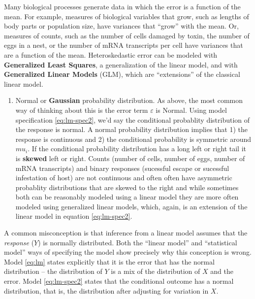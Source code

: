 \documentclass[]{book}
\providecommand{\tightlist}{%
  \setlength{\itemsep}{0pt}\setlength{\parskip}{0pt}}
\begin{document}
Many biological processes generate data in which the error is a function
of the mean. For example, measures of biological variables that grow,
such as lengths of body parts or population size, have variances that
``grow'' with the mean. Or, measures of counts, such as the number of
cells damaged by toxin, the number of eggs in a nest, or the number of
mRNA transcripts per cell have variances that are a function of the
mean. Heteroskedastic error can be modeled with \textbf{Generalized
Least Squares}, a generalization of the linear model, and with
\textbf{Generalized Linear Models} (GLM), which are ``extensions'' of
the classical linear model.

\begin{enumerate}
\def\labelenumi{\arabic{enumi}.}
\setcounter{enumi}{1}
\tightlist
\item
  Normal or \textbf{Gaussian} probability distribution. As above, the
  most common way of thinking about this is the error term
  \(\varepsilon\) is Normal. Using model specification
  \eqref{eq:lm-spec2}, we'd say the conditional probablity distribution of
  the response is normal. A normal probability distribution implies that
  1) the response is continuous and 2) the conditional probability is
  symmetric around \(mu_i\). If the conditional probability distribution
  has a long left or right tail it is \textbf{skewed} left or right.
  Counts (number of cells, number of eggs, number of mRNA transcripts)
  and binary responses (sucessful escape or sucessful infestation of
  host) are not continuous and often often have asymmetric probablity
  distributions that are skewed to the right and while sometimes both
  can be reasonably modeled using a linear model they are more often
  modeled using generalized linear models, which, again, is an extension
  of the linear model in equation \eqref{eq:lm-spec2}.
\end{enumerate}

A common misconception is that inference from a linear model assumes
that the \emph{response} (\(Y\)) is normally distributed. Both the
``linear model'' and ``statistical model'' ways of specifying the model
show precisely why this conception is wrong. Model \eqref{eq:lm} states
explicitly that it is the error that has the normal distribution -- the
distribution of \(Y\) is a mix of the distribution of \(X\) and the
error. Model \eqref{eq:lm-spec2} states that the conditional outcome has a
normal distribution, that is, the distribution after adjusting for
variation in \(X\).
\end{document}
